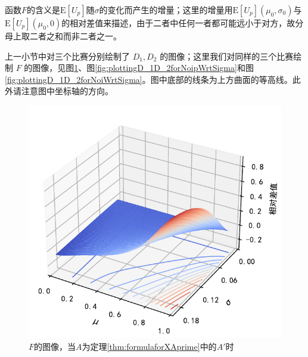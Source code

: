             函数$F$的含义是$\mathrm{E}\left[U_p\right]$随$\sigma$的变化而产生的增量；这里的增量用$\mathrm{E}\left[U_p\right](\mu_0,\sigma_0)$与$\mathrm{E}\left[U_p\right](\mu_0,0)$的相对差值来描述，由于二者中任何一者都可能远小于对方，故分母上取二者之和而非二者之一。

            \vspace{1.5ex}

            上一小节中对三个比赛分别绘制了 $D_1,D_2$ 的图像；这里我们对同样的三个比赛绘制 $F$ 的图像，见图\ref{fig:plottingD_1D_2forAprimeWrtSigma}、图\ref{fig:plottingD_1D_2forNoipWrtSigma}和图\ref{fig:plottingD_1D_2forNoiWrtSigma}。图中底部的线条为上方曲面的等高线。此外请注意图中坐标轴的方向。

            \begin{figure}[hp]
                \centering
                \includegraphics[width=\textwidth]{fig/plottingD_1D_2WrtSigma.pdf}
                \caption{$F$的图像，当$A$为定理\ref{thm:formulaforXAprime}中的$A'$时}
                \label{fig:plottingD_1D_2forAprimeWrtSigma}
            \end{figure}

